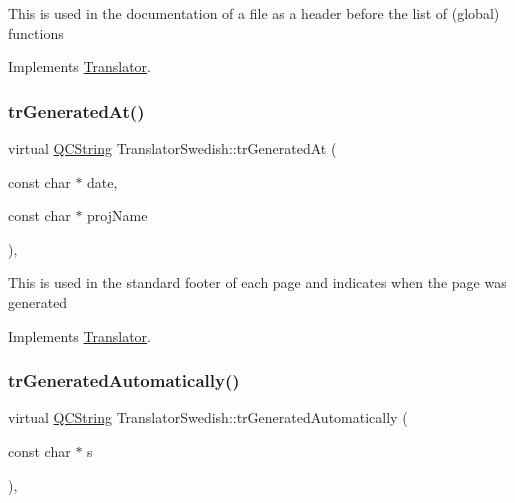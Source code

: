 This is used in the documentation of a file as a header before the list of (global) functions 

Implements \mbox{\hyperlink{class_translator}{Translator}}.

\mbox{\label{class_translator_swedish_aa58ebdd4ccce07ee353078ff333a3287}} 
\subsubsection{\texorpdfstring{trGeneratedAt()}{trGeneratedAt()}}
{\footnotesize\ttfamily virtual \mbox{\hyperlink{class_q_c_string}{Q\+C\+String}} Translator\+Swedish\+::tr\+Generated\+At (\begin{DoxyParamCaption}\item[{const char $\ast$}]{date,  }\item[{const char $\ast$}]{proj\+Name }\end{DoxyParamCaption})\hspace{0.3cm}{\ttfamily [inline]}, {\ttfamily [virtual]}}

This is used in the standard footer of each page and indicates when the page was generated 

Implements \mbox{\hyperlink{class_translator}{Translator}}.

\mbox{\label{class_translator_swedish_a5dcab85d1239cdce287a7b4744260121}} 
\subsubsection{\texorpdfstring{trGeneratedAutomatically()}{trGeneratedAutomatically()}}
{\footnotesize\ttfamily virtual \mbox{\hyperlink{class_q_c_string}{Q\+C\+String}} Translator\+Swedish\+::tr\+Generated\+Automatically (\begin{DoxyParamCaption}\item[{const char $\ast$}]{s }\end{DoxyParamCaption})\hspace{0.3cm}{\ttfamily [inline]}, {\ttfamily [virtual]}}

